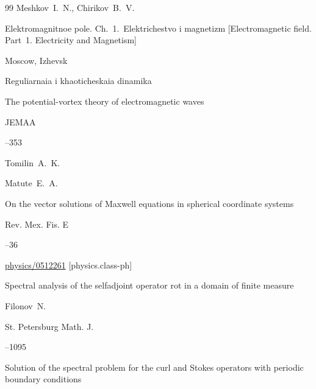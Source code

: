 \begin{thebibliography}{99}
\by Meshkov~I.~N., Chirikov~B.~V.

\book Elektromagnitnoe pole. Ch.~1.~Elektrichestvo i magnetizm \rm [Electromagnetic field. Part~1. Electricity and Magnetism]

\publaddr Moscow, Izhevsk

\publ Reguliarnaia i khaoticheskaia dinamika






\paper The potential-vortex theory of electromagnetic waves 


\jour JEMAA




--353

\by Tomilin~A.~K. 




\by Matute~E.~A. 

\paper On the vector solutions of Maxwell equations  in spherical coordinate systems

\jour Rev. Mex. Fis. E 



--36


\arxiv \href{http://arxiv.org/abs/physics/0512261}{physics/0512261} [physics.class-ph]






\paper Spectral analysis of the selfadjoint operator rot in a domain of finite measure

\by Filonov~N.

\jour St. Petersburg Math. J.




--1095




\paper Solution of the spectral problem for the curl and Stokes operators with periodic boundary conditions


\end{thebibliography}

